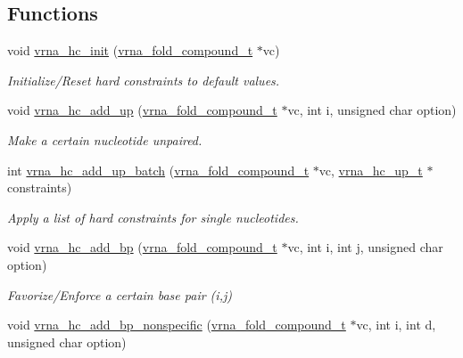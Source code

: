 \subsection*{Functions}
\begin{DoxyCompactItemize}
\item 
void \hyperlink{group__hard__constraints_ga36ff456c43bf920629cee5a236e4f0ff}{vrna\+\_\+hc\+\_\+init} (\hyperlink{group__fold__compound_ga1b0cef17fd40466cef5968eaeeff6166}{vrna\+\_\+fold\+\_\+compound\+\_\+t} $\ast$vc)
\begin{DoxyCompactList}\small\item\em Initialize/\+Reset hard constraints to default values. \end{DoxyCompactList}\item 
void \hyperlink{group__hard__constraints_ga447d88e06ad97bb225cd83310ace8345}{vrna\+\_\+hc\+\_\+add\+\_\+up} (\hyperlink{group__fold__compound_ga1b0cef17fd40466cef5968eaeeff6166}{vrna\+\_\+fold\+\_\+compound\+\_\+t} $\ast$vc, int i, unsigned char option)
\begin{DoxyCompactList}\small\item\em Make a certain nucleotide unpaired. \end{DoxyCompactList}\item 
int \hyperlink{group__hard__constraints_ga5070f296c8af2baea10951525519464f}{vrna\+\_\+hc\+\_\+add\+\_\+up\+\_\+batch} (\hyperlink{group__fold__compound_ga1b0cef17fd40466cef5968eaeeff6166}{vrna\+\_\+fold\+\_\+compound\+\_\+t} $\ast$vc, \hyperlink{group__hard__constraints_ga8cd53427a942a81c87ec526bbff32ef9}{vrna\+\_\+hc\+\_\+up\+\_\+t} $\ast$constraints)
\begin{DoxyCompactList}\small\item\em Apply a list of hard constraints for single nucleotides. \end{DoxyCompactList}\item 
void \hyperlink{group__hard__constraints_ga7cba95ebe2ceb5ec9a5768f2232854fd}{vrna\+\_\+hc\+\_\+add\+\_\+bp} (\hyperlink{group__fold__compound_ga1b0cef17fd40466cef5968eaeeff6166}{vrna\+\_\+fold\+\_\+compound\+\_\+t} $\ast$vc, int i, int j, unsigned char option)
\begin{DoxyCompactList}\small\item\em Favorize/\+Enforce a certain base pair (i,j) \end{DoxyCompactList}\item 
void \hyperlink{group__hard__constraints_gaed50398ade2d4852c9e82592fe76046c}{vrna\+\_\+hc\+\_\+add\+\_\+bp\+\_\+nonspecific} (\hyperlink{group__fold__compound_ga1b0cef17fd40466cef5968eaeeff6166}{vrna\+\_\+fold\+\_\+compound\+\_\+t} $\ast$vc, int i, int d, unsigned char option)

\end{DoxyCompactItemize}
